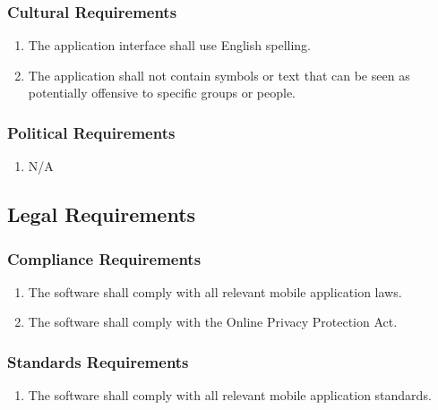 \documentclass[]{article}
\begin{document}
\subsubsection{Cultural Requirements}
\label{ssub:cultural_requirements}
\begin{enumerate}[{CP}1. ]
	\item The application interface shall use English spelling.
	\item The application shall not contain symbols or text that can be seen as potentially offensive to specific groups or people.
\end{enumerate}

\subsubsection{Political Requirements}
\label{ssub:political_requirements}
\begin{enumerate}[{CP}1. ]
	\item N/A
\end{enumerate}


\subsection{Legal Requirements}
\label{sub:legal_requirements}

\subsubsection{Compliance Requirements}
\label{ssub:compliance_requirements}
\begin{enumerate}[{LR}1. ]
	\item The software shall comply with all relevant mobile application laws.
	\item The software shall comply with the Online Privacy Protection Act.
\end{enumerate}

\subsubsection{Standards Requirements}
\label{ssub:standards_requirements}
\begin{enumerate}[{LR}1. ]
	\item The software shall comply with all relevant mobile application standards.
\end{enumerate}
\end{document}
